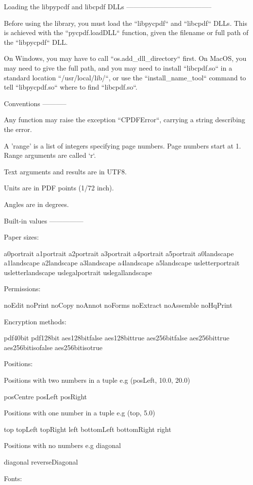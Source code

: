Loading the libpypcdf and libcpdf DLLs
--------------------------------------

Before using the library, you must load the ``libpycpdf`` and ``libcpdf`` DLLs.
This is achieved with the ``pycpdf.loadDLL`` function, given the filename or
full path of the ``libpycpdf`` DLL.

On Windows, you may have to call ``os.add_dll_directory`` first. On MacOS, you
may need to give the full path, and you may need to install ``libcpdf.so`` in a
standard location ``/usr/local/lib/``, or use the ``install_name_tool`` command
to tell ``libpycpdf.so`` where to find ``libcpdf.so``.

Conventions
-----------

Any function may raise the exception ``CPDFError``, carrying a string describing
the error.

A 'range' is a list of integers specifying page numbers. Page numbers start at
1. Range arguments are called `r`.

Text arguments and results are in UTF8.

Units are in PDF points (1/72 inch).

Angles are in degrees.


Built-in values
---------------

Paper sizes:

a0portrait a1portrait a2portrait a3portrait a4portrait a5portrait a0landscape
a1landscape a2landscape a3landscape a4landscape a5landscape usletterportrait
usletterlandscape uslegalportrait uslegallandscape

Permissions:

noEdit noPrint noCopy noAnnot noForms noExtract noAssemble noHqPrint

Encryption methods:

pdf40bit pdf128bit aes128bitfalse aes128bittrue aes256bitfalse aes256bittrue
aes256bitisofalse aes256bitisotrue

Positions:

Positions with two numbers in a tuple e.g (posLeft, 10.0, 20.0)

posCentre posLeft posRight

Positions with one number in a tuple e.g (top, 5.0)

top topLeft topRight left bottomLeft bottomRight right

Positions with no numbers e.g diagonal

diagonal reverseDiagonal

Fonts:

